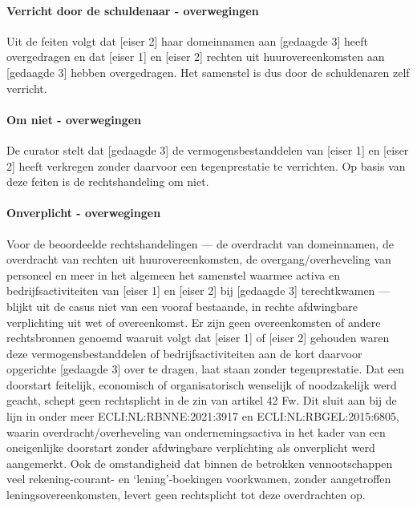 \documentclass[
  dutch,
  a4paper,
]{article}
\begin{document}
\paragraph{Verricht door de schuldenaar - overwegingen}\label{verricht-door-de-schuldenaar---overwegingen-22}

Uit de feiten volgt dat {[}eiser 2{]} haar domeinnamen aan {[}gedaagde 3{]} heeft overgedragen en dat {[}eiser 1{]} en {[}eiser 2{]} rechten uit huurovereenkomsten aan {[}gedaagde 3{]} hebben overgedragen. Het samenstel is dus door de schuldenaren zelf verricht.

\paragraph{Om niet - overwegingen}\label{om-niet---overwegingen-22}

De curator stelt dat {[}gedaagde 3{]} de vermogensbestanddelen van {[}eiser 1{]} en {[}eiser 2{]} heeft verkregen zonder daarvoor een tegenprestatie te verrichten. Op basis van deze feiten is de rechtshandeling om niet.

\paragraph{Onverplicht - overwegingen}\label{onverplicht---overwegingen-22}

Voor de beoordeelde rechtshandelingen --- de overdracht van domeinnamen, de overdracht van rechten uit huurovereenkomsten, de overgang/overheveling van personeel en meer in het algemeen het samenstel waarmee activa en bedrijfsactiviteiten van {[}eiser 1{]} en {[}eiser 2{]} bij {[}gedaagde 3{]} terechtkwamen --- blijkt uit de casus niet van een vooraf bestaande, in rechte afdwingbare verplichting uit wet of overeenkomst. Er zijn geen overeenkomsten of andere rechtsbronnen genoemd waaruit volgt dat {[}eiser 1{]} of {[}eiser 2{]} gehouden waren deze vermogensbestanddelen of bedrijfsactiviteiten aan de kort daarvoor opgerichte {[}gedaagde 3{]} over te dragen, laat staan zonder tegenprestatie. Dat een doorstart feitelijk, economisch of organisatorisch wenselijk of noodzakelijk werd geacht, schept geen rechtsplicht in de zin van artikel 42 Fw. Dit sluit aan bij de lijn in onder meer ECLI:NL:RBNNE:2021:3917 en ECLI:NL:RBGEL:2015:6805, waarin overdracht/overheveling van ondernemingsactiva in het kader van een oneigenlijke doorstart zonder afdwingbare verplichting als onverplicht werd aangemerkt. Ook de omstandigheid dat binnen de betrokken vennootschappen veel rekening-courant- en `lening'-boekingen voorkwamen, zonder aangetroffen leningsovereenkomsten, levert geen rechtsplicht tot deze overdrachten op.
\end{document}
